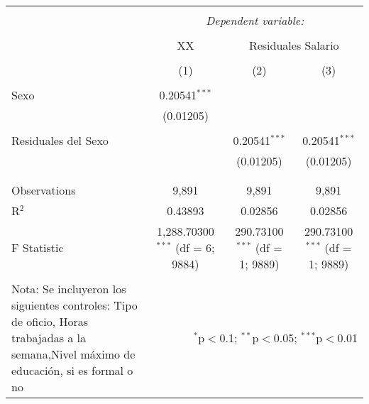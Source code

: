 
\begin{table}[!htbp] \centering 
  \caption{} 
  \label{} 
\begin{tabular}{@{\extracolsep{5pt}}lccc} 
\\[-1.8ex]\hline 
\hline \\[-1.8ex] 
 & \multicolumn{3}{c}{\textit{Dependent variable:}} \\ 
\cline{2-4} 
\\[-1.8ex] & XX & \multicolumn{2}{c}{Residuales Salario} \\ 
\\[-1.8ex] & (1) & (2) & (3)\\ 
\hline \\[-1.8ex] 
 Sexo & 0.20541$^{***}$ &  &  \\ 
  & (0.01205) &  &  \\ 
  & & & \\ 
 Residuales del Sexo &  & 0.20541$^{***}$ & 0.20541$^{***}$ \\ 
  &  & (0.01205) & (0.01205) \\ 
  & & & \\ 
\hline \\[-1.8ex] 
Observations & 9,891 & 9,891 & 9,891 \\ 
R$^{2}$ & 0.43893 & 0.02856 & 0.02856 \\ 
F Statistic & 1,288.70300$^{***}$ (df = 6; 9884) & 290.73100$^{***}$ (df = 1; 9889) & 290.73100$^{***}$ (df = 1; 9889) \\ 
\hline 
\hline \\[-1.8ex] 
Nota: Se incluyeron los siguientes controles: Tipo de oficio, Horas trabajadas a la semana,Nivel máximo de educación, si es formal o no & \multicolumn{3}{r}{$^{*}$p$<$0.1; $^{**}$p$<$0.05; $^{***}$p$<$0.01} \\ 
\end{tabular} 
\end{table} 

